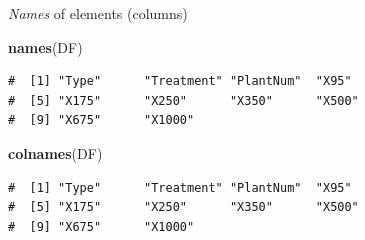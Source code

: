 \documentclass[
  11pt,
  ignorenonframetext,
]{beamer}
\newenvironment{Shaded}{\begin{snugshade}}{\end{snugshade}}
\newcommand{\FunctionTok}[1]{\textcolor[rgb]{0.13,0.29,0.53}{\textbf{#1}}}
\newcommand{\NormalTok}[1]{#1}
\begin{document}
\begin{frame}[fragile]{\emph{Names} of elements (columns)}
\protect\hypertarget{names-of-elements-columns}{}
\begin{Shaded}
\begin{Highlighting}[]
\FunctionTok{names}\NormalTok{(DF)}
\end{Highlighting}
\end{Shaded}

\begin{verbatim}
#  [1] "Type"      "Treatment" "PlantNum"  "X95"      
#  [5] "X175"      "X250"      "X350"      "X500"     
#  [9] "X675"      "X1000"
\end{verbatim}

\begin{Shaded}
\begin{Highlighting}[]
\FunctionTok{colnames}\NormalTok{(DF)}
\end{Highlighting}
\end{Shaded}

\begin{verbatim}
#  [1] "Type"      "Treatment" "PlantNum"  "X95"      
#  [5] "X175"      "X250"      "X350"      "X500"     
#  [9] "X675"      "X1000"
\end{verbatim}
\end{frame}
\end{document}
